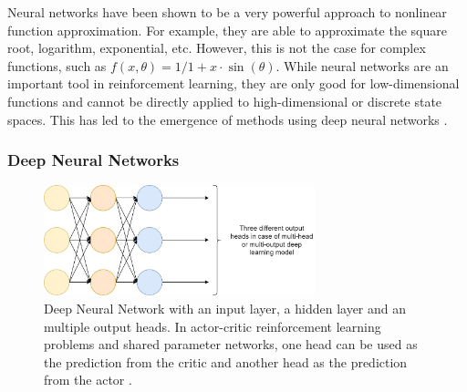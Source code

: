 
Neural networks have been shown to be a very powerful approach to nonlinear function approximation. For example, they are able to approximate the square root, logarithm, exponential, etc. However, this is not the case for complex functions, such as $f(x, \theta) = 1/1 + x \cdot \sin(\theta)$. While neural networks are an important tool in reinforcement learning, they are only good for low-dimensional functions and cannot be directly applied to high-dimensional or discrete state spaces. This has led to the emergence of methods using deep neural networks \cite{sutton2018reinforcement}.





\subsubsection{Deep Neural Networks}

\begin{figure}[!ht]
    \centering
    \includegraphics[width=0.7\textwidth]{images/multi_head_nn_exmp.jpg}
    \caption{Deep Neural Network with an input layer, a hidden layer and an multiple output heads. In actor-critic reinforcement learning problems and shared parameter networks, one head can be used as the prediction from the critic and another head as the prediction from the actor \cite{MultiHea51, sutton2018reinforcement}.
    }
    \label{fig:deep-nnetwork}
\end{figure}


